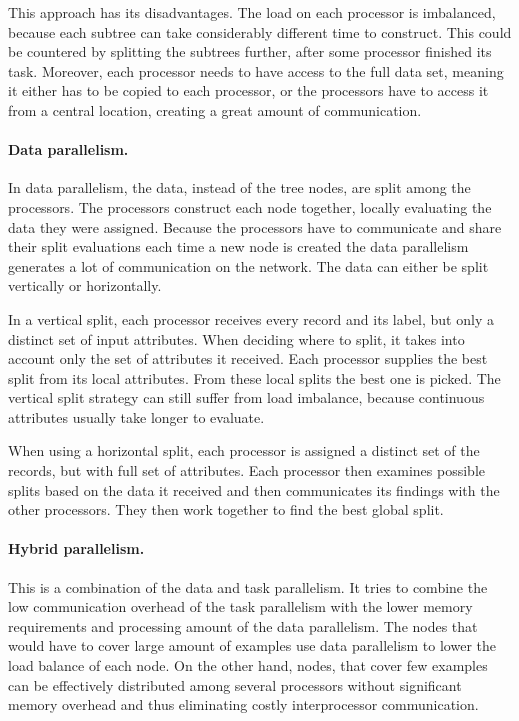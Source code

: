 \documentclass[thesis=B,english]{FITthesis}[2012/10/20]
\begin{document}
		This approach has its disadvantages. The load on each processor is imbalanced, because each subtree can take considerably different time to construct. This could be countered by splitting the subtrees further, after some processor finished its task. Moreover, each processor needs to have access to the full data set, meaning it either has to be copied to each processor, or the processors have to access it from a central location, creating a great amount of communication. 

		\paragraph*{Data parallelism.} In data parallelism, the data, instead of the tree nodes, are split among the processors. The processors construct each node together, locally evaluating the data they were assigned. Because the processors have to communicate and share their split evaluations each time a new node is created the data parallelism generates a lot of communication on the network. The data can either be split vertically or horizontally. 

		In a vertical split, each processor receives every record and its label, but only a distinct set of input attributes. When deciding where to split, it takes into account only the set of attributes it received. Each processor supplies the best split from its local attributes. From these local splits the best one is picked. The vertical split strategy can still suffer from load imbalance, because continuous attributes usually take longer to evaluate.

		When using a horizontal split, each processor is assigned a distinct set of the records, but with full set of attributes. Each processor then examines possible splits based on the data it received and then communicates its findings with the other processors. They then work together to find the best global split.

		\paragraph*{Hybrid parallelism.} This is a combination of the data and task parallelism. It tries to combine the low communication overhead of the task parallelism with the lower memory requirements and processing amount of the data parallelism. The nodes that would have to cover large amount of examples use data parallelism to lower the load balance of each node. On the other hand, nodes, that cover few examples can be effectively distributed among several processors without significant memory overhead and thus eliminating costly interprocessor communication.
\end{document}
